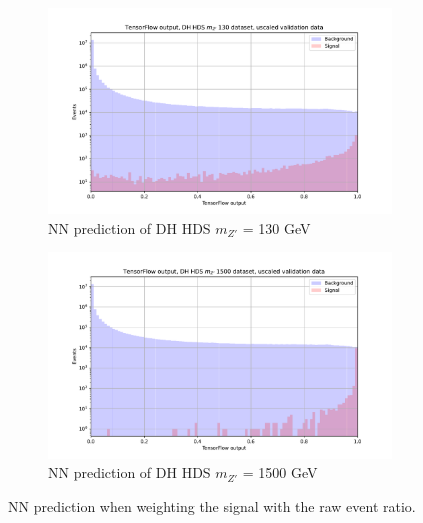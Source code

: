 \documentclass[14pt, a4paper]{book}
\begin{document}
\begin{figure}[!ht]
	\centering
	\begin{subfigure}[b]{0.49\textwidth}
        \centering
        \includegraphics[width=1\textwidth]{DH_HDS_mZp_130/VAL_unscaled.pdf}
        \caption{NN prediction of DH HDS $m_{Z'}$ = 130 GeV}\label{fig:MC_EVT_SIG_DH_HDS_130}
     \end{subfigure}
     \hfill
     \begin{subfigure}[b]{0.49\textwidth}
        \centering
        \includegraphics[width=1\textwidth]{DH_HDS_mZp_1500/VAL_unscaled.pdf}
        \caption{NN prediction of DH HDS $m_{Z'}$ = 1500 GeV}\label{fig:MC_EVT_SIG_DH_HDS_1500}
     \end{subfigure}
     \caption{NN prediction when weighting the signal with the raw event ratio.}\label{fig:MC_EVT_SIG_DH_HDS}
\end{figure}
\graphicspath{{../../../Plots/TESTING/NeuralNetwork/BALANCED_WEIGHTING/MC_WGT_BKG_DOWN/}}
\end{document}
